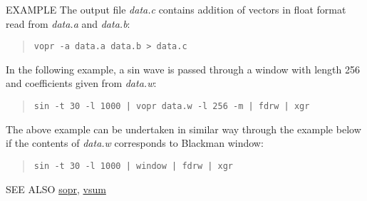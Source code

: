 \begin{qsection}{EXAMPLE}
The output file {\em data.c} contains addition of
vectors in float format read from {\em data.a} and {\em data.b}:
\begin{quote}
  \verb!vopr -a data.a data.b > data.c !
\end{quote}
\par
In the following example, a sin wave is passed through
a window with length 256 and coefficients given from
{\em data.w}:
\begin{quote}
  \verb!sin -t 30 -l 1000 | vopr data.w -l 256 -m | fdrw | xgr!
\end{quote}
The above example can be undertaken in similar way
through the example below if the contents of {\em data.w} corresponds
to Blackman window:
\begin{quote}
  \verb!sin -t 30 -l 1000 | window | fdrw | xgr!
\end{quote}
\end{qsection}

\begin{qsection}{SEE ALSO}
\hyperlink{sopr}{sopr},
\hyperlink{vsum}{vsum}
\end{qsection}
